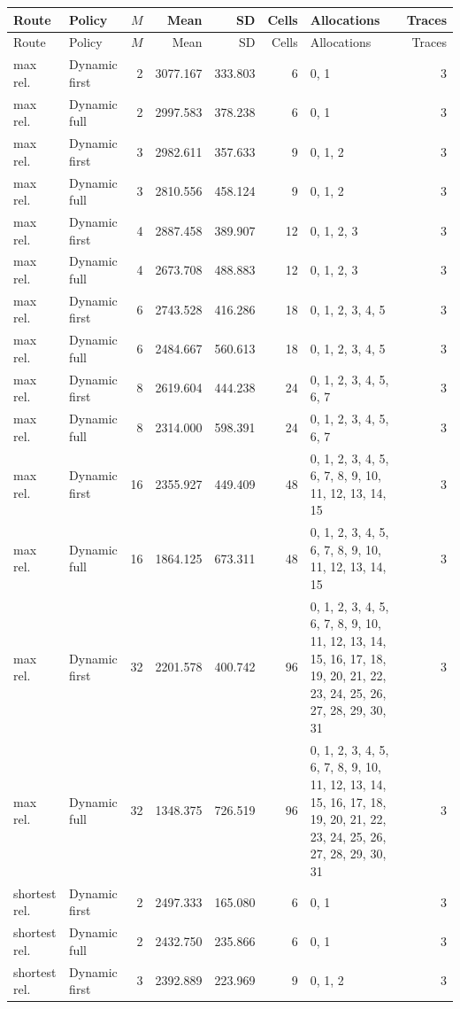 \documentclass[10pt,a4paper]{article}
\begin{document}
\tiny\setlength{\tabcolsep}{2pt}\begin{longtable}{@{}p{23mm}p{29mm}rrrrp{36mm}r@{}}
\toprule Route & Policy & $M$ & Mean & SD & Cells & Allocations & Traces \\ \midrule\endfirsthead
\toprule Route & Policy & $M$ & Mean & SD & Cells & Allocations & Traces \\ \midrule\endhead
\bottomrule\endfoot
max rel. & Dynamic first & 2 & 3077.167 & 333.803 & 6 & 0, 1 & 3 \\
max rel. & Dynamic full & 2 & 2997.583 & 378.238 & 6 & 0, 1 & 3 \\
max rel. & Dynamic first & 3 & 2982.611 & 357.633 & 9 & 0, 1, 2 & 3 \\
max rel. & Dynamic full & 3 & 2810.556 & 458.124 & 9 & 0, 1, 2 & 3 \\
max rel. & Dynamic first & 4 & 2887.458 & 389.907 & 12 & 0, 1, 2, 3 & 3 \\
max rel. & Dynamic full & 4 & 2673.708 & 488.883 & 12 & 0, 1, 2, 3 & 3 \\
max rel. & Dynamic first & 6 & 2743.528 & 416.286 & 18 & 0, 1, 2, 3, 4, 5 & 3 \\
max rel. & Dynamic full & 6 & 2484.667 & 560.613 & 18 & 0, 1, 2, 3, 4, 5 & 3 \\
max rel. & Dynamic first & 8 & 2619.604 & 444.238 & 24 & 0, 1, 2, 3, 4, 5, 6, 7 & 3 \\
max rel. & Dynamic full & 8 & 2314.000 & 598.391 & 24 & 0, 1, 2, 3, 4, 5, 6, 7 & 3 \\
max rel. & Dynamic first & 16 & 2355.927 & 449.409 & 48 & 0, 1, 2, 3, 4, 5, 6, 7, 8, 9, 10, 11, 12, 13, 14, 15 & 3 \\
max rel. & Dynamic full & 16 & 1864.125 & 673.311 & 48 & 0, 1, 2, 3, 4, 5, 6, 7, 8, 9, 10, 11, 12, 13, 14, 15 & 3 \\
max rel. & Dynamic first & 32 & 2201.578 & 400.742 & 96 & 0, 1, 2, 3, 4, 5, 6, 7, 8, 9, 10, 11, 12, 13, 14, 15, 16, 17, 18, 19, 20, 21, 22, 23, 24, 25, 26, 27, 28, 29, 30, 31 & 3 \\
max rel. & Dynamic full & 32 & 1348.375 & 726.519 & 96 & 0, 1, 2, 3, 4, 5, 6, 7, 8, 9, 10, 11, 12, 13, 14, 15, 16, 17, 18, 19, 20, 21, 22, 23, 24, 25, 26, 27, 28, 29, 30, 31 & 3 \\
shortest rel. & Dynamic first & 2 & 2497.333 & 165.080 & 6 & 0, 1 & 3 \\
shortest rel. & Dynamic full & 2 & 2432.750 & 235.866 & 6 & 0, 1 & 3 \\
shortest rel. & Dynamic first & 3 & 2392.889 & 223.969 & 9 & 0, 1, 2 & 3 \\

\end{longtable}
\end{document}
